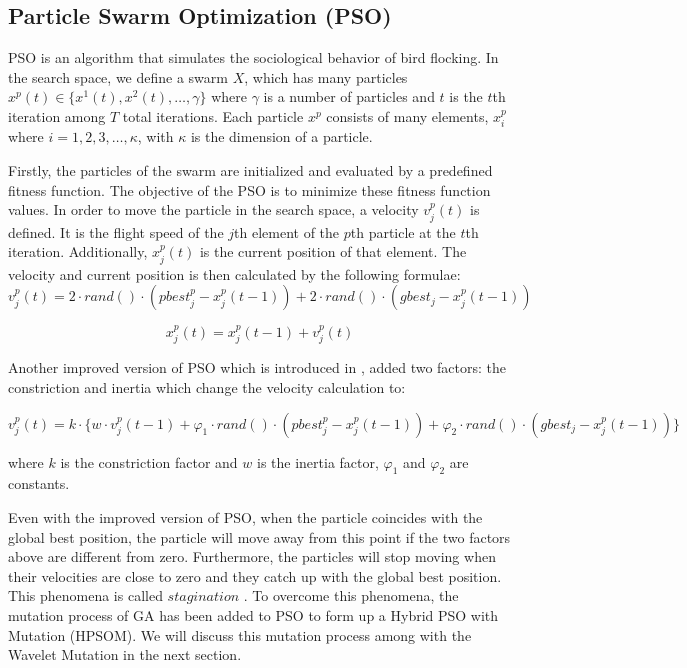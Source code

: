 \subsection{Particle Swarm Optimization (PSO)}
PSO is an algorithm that simulates the sociological behavior of bird flocking. In the search space, we define a swarm $X$, which has many particles $x^p(t) \in \{x^1(t), x^2(t), \ldots, \gamma\}$ where $\gamma$ is a number of particles and $t$ is the $t$th iteration among $T$ total iterations. Each particle $x^p$ consists of many elements, $x^p_i$ where $i = 1,2,3, \ldots, \kappa$, with $\kappa$ is the dimension of a particle.

Firstly, the particles of the swarm are initialized and evaluated by a predefined fitness function. The objective of the PSO is to minimize these fitness function values. In order to move the particle in the search space, a velocity $v^p_j(t)$ is defined. It is the flight speed of the $j$th element of the $p$th particle at the $t$th iteration. Additionally, $x^p_j(t)$ is the current position of that element. The velocity and current position is then calculated by the following formulae:
\begin{equation}
v_{j}^{p}(t) = 2 \cdot rand() \cdot (pbest_{j}^{p} - x_{j}^{p}(t-1))
+ 2 \cdot rand() \cdot (gbest_{j} - x_{j}^{p}(t-1))
\end{equation}

\begin{equation}
x^p_j(t) = x^p_j(t - 1) + v^p_j(t)
\end{equation}

Another improved version of PSO which is introduced in \cite{eberhart2000comparing}, added two factors: the constriction and inertia which change the velocity calculation to:

\begin{equation}
v_{j}^{p}(t) = k \cdot \{w \cdot v^p_j(t-1) + \varphi_1 \cdot rand() \cdot (pbest_{j}^{p} - x_{j}^{p}(t-1))
+ \varphi_2 \cdot rand() \cdot (gbest_{j} - x_{j}^{p}(t-1)) \}
\end{equation}

where $k$ is the constriction factor and $w$ is the inertia factor, $\varphi_1$ and $\varphi_2$ are constants.

Even with the improved version of PSO, when the particle coincides with the global best position, the particle will move away from this point if the two factors above are different from zero. Furthermore, the particles will stop moving when their velocities are close to zero and they catch up with the global best position. This phenomena is called $stagination$ \cite{eberhart1998comparison}. To overcome this phenomena, the mutation process of GA has been added to PSO to form up a Hybrid PSO with Mutation (HPSOM). We will discuss this mutation process among with the Wavelet Mutation in the next section.

